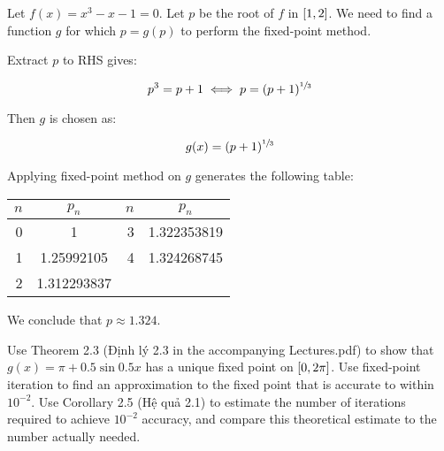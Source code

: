 \documentclass[../../../../Assignments]{subfiles}
\begin{document}
\begin{solution}
    Let \(f(x) = x^3 - x - 1 = 0\). Let \(p\) be the root of \(f\) in
    \(\interval{1}{2}\). We need to find a function \(g\) for which \(p = g(p)\)
    to perform the fixed-point method.

    Extract \(p\) to RHS gives:

    \[p^3 = p + 1 \iff p = (p + 1)^{\sfrac{1}{3}}\]

    Then \(g\) is chosen as:

    \[g(x) = (p + 1)^{\sfrac{1}{3}}\]

    Applying fixed-point method on \(g\) generates the following table:

    \begin{table}[H]
        \centering
        \begin{tabular}{r S[table-format=1.9] r S[table-format=1.9]}
            \toprule
            \(n\)  &   {\(p_n\)}   &  \(n\)  &   {\(p_n\)}   \\
              &  1            &      3  &  1.322353819  \\
                1  &  1.25992105   &      4  &  1.324268745  \\
                2  &  1.312293837  &         &               \\
            \bottomrule
        \end{tabular}
    \end{table}

    We conclude that \(p \approx \num{1.324}\).
\end{solution}

\begin{exercise}
    Use Theorem 2.3 (Định lý 2.3 in the accompanying Lectures.pdf) to show that
    \(g(x) = \pi + \num{0.5} \sin{\num{0.5} x}\) has a unique fixed point on
    \(\interval{0}{2 \pi}\). Use fixed-point iteration to find an approximation
    to the fixed point that is accurate to within \(10^{-2}\). Use Corollary 2.5
    (Hệ quả 2.1) to estimate the number of iterations required to achieve
    \(10^{-2}\) accuracy, and compare this theoretical estimate to the number
    actually needed.
\end{exercise}
\end{document}
